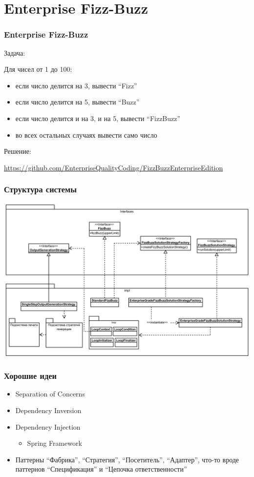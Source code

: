 \documentclass[xetex,mathserif,serif]{beamer}
\begin{document}
	\section{Enterprise Fizz-Buzz}

	\begin{frame}
		\frametitle{Enterprise Fizz-Buzz}
		Задача:

		Для чисел от 1 до 100:
		\begin{itemize}
			\item если число делится на 3, вывести ``Fizz''
			\item если число делится на 5, вывести ``Buzz''
			\item если число делится и на 3, и на 5, вывести ``FizzBuzz''
			\item во всех остальных случаях вывести само число
		\end{itemize}

		Решение:

		\url{https://github.com/EnterpriseQualityCoding/FizzBuzzEnterpriseEdition}
	\end{frame}

	\begin{frame}
		\frametitle{Структура системы}
		\begin{center}
			\includegraphics[width=\textwidth]{fizzBuzzArchitecture.png}
		\end{center}
	\end{frame}

	\begin{frame}
		\frametitle{Хорошие идеи}
		\begin{itemize}
			\item Separation of Concerns
			\item Dependency Inversion
			\item Dependency Injection
			\begin{itemize}
				\item Spring Framework
			\end{itemize}
			\item Паттерны ``Фабрика'', ``Стратегия'', ``Посетитель'', ``Адаптер'', что-то вроде паттернов ``Спецификация'' и ``Цепочка ответственности''
		\end{itemize}
	\end{frame}
\end{document}
